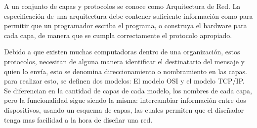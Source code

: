 A un conjunto de capas y protocolos se conoce como Arquitectura de Red. La especificación de una arquitectura debe contener suficiente información como para permitir que un programador escriba el programa, o construya el hardware para cada capa, de manera que se cumpla correctamente el protocolo apropiado.

Debido a que existen muchas computadoras dentro de una organización, estos protocolos, necesitan de alguna manera identificar el destinatario del mensaje y quien lo envía, esto se denomina direccionamiento o nombramiento en las capas. para realizar esto, se definen dos modelos: El modelo OSI y el modelo TCP/IP. Se diferencian en la cantidad de capas de cada modelo, los nombres de cada capa, pero la funcionalidad sigue siendo la misma: intercambiar información entre dos dispositivos, usando un esquema de capas, las cuales permiten que el diseñador tenga mas facilidad a la hora de diseñar una red. 




